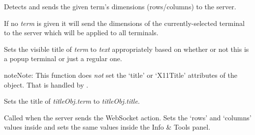 \documentclass[letterpaper,10pt,openany]{sphinxmanual}
\begin{document}

\begin{fulllineitems}
\label{Applications/terminal/js_terminal:GateOne.Terminal.sendDimensions}
Detects and sends the given term's dimensions (rows/columns) to the server.

If no \emph{term} is given it will send the dimensions of the currently-selected terminal to the server which will be applied to all terminals.

\end{fulllineitems}


\begin{fulllineitems}
\label{Applications/terminal/js_terminal:GateOne.Terminal.setTitle}
Sets the visible title of \emph{term} to \emph{text} appropriately based on whether or not this is a popup terminal or just a regular one.

\begin{notice}{note}{Note:}
This function does \emph{not} set the `title' or `X11Title' attributes of the  object.  That is handled by {\hyperref[Applications/terminal/js_terminal:GateOne.Terminal.setTitleAction]{}}.
\end{notice}

\end{fulllineitems}


\begin{fulllineitems}
\label{Applications/terminal/js_terminal:GateOne.Terminal.setTitleAction}
Sets the title of \emph{titleObj.term} to \emph{titleObj.title}.

\end{fulllineitems}


\begin{fulllineitems}
\label{Applications/terminal/js_terminal:GateOne.Terminal.resizeAction}
Called when the server sends the  WebSocket action.  Sets the `rows' and `columns' values inside  and sets the same values inside the Info \& Tools panel.

\end{fulllineitems}
\end{document}
